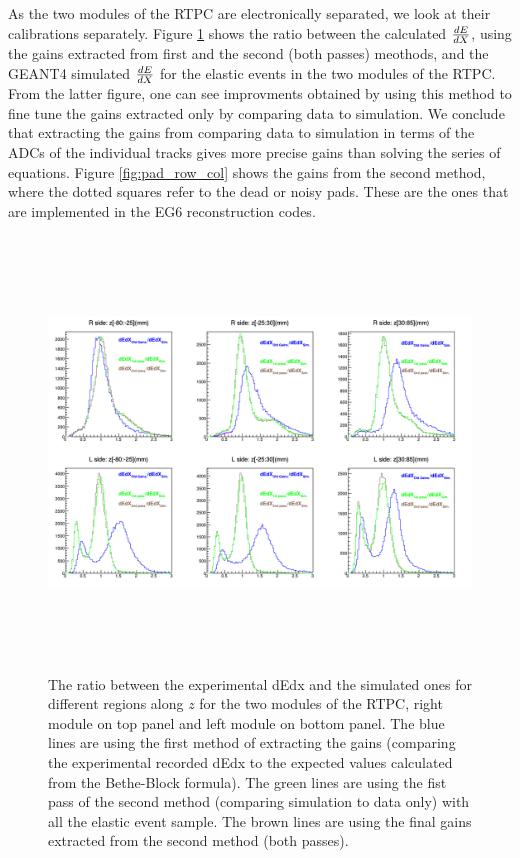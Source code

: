 As the two modules of the RTPC are electronically separated, we look at their 
calibrations separately. Figure \ref{fig:dedxre} shows the ratio between the 
calculated $\small{\frac{dE}{dX}}$, using the gains extracted from first and 
the second (both passes) meothods, and the GEANT4 simulated 
$\small{\frac{dE}{dX}}$ for the elastic events in the two modules of the RTPC.  
From the latter figure, one can see improvments obtained by using this method 
to fine tune the gains extracted only by comparing data to simulation. We 
conclude that extracting the gains from comparing data to simulation in terms 
of the ADCs of the individual tracks gives more precise gains than solving the 
series of equations. Figure \ref{fig:pad_row_col} shows the gains from the 
second method, where the dotted squares refer to the dead or noisy pads. These 
are the ones that are implemented in the EG6 reconstruction codes.\\


\begin{figure}[tpb]
\hspace{-0.5 cm}
\includegraphics[height=11.5cm]{fig_rtpc/updates/dedx_ratio_elastic_NAB.png}
\caption{The ratio between the experimental dEdx and the simulated ones for 
   different regions along $z$ for the two modules of the RTPC, right module on 
   top panel and left module on bottom panel. The blue lines are using the 
   first method of extracting the gains (comparing the experimental recorded 
   dEdx to the expected values calculated from the Bethe-Block formula). The 
green lines are using the fist pass of the second method (comparing simulation 
to data only) with all the elastic event sample. The brown lines are using the 
final gains extracted from the second method (both passes).}
\label{fig:dedxre}
\end{figure}



